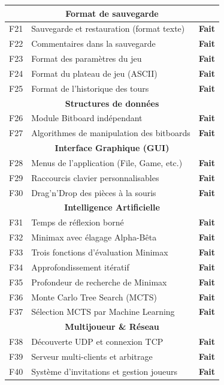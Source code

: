 \documentclass[a4paper]{article}
\newcommand{\fait}{\textcolor{green!70!black}{\textbf{Fait}}}
\begin{document}
\begin{center}
\begin{longtable}{|c|p{8.5cm}|c|}
\multicolumn{3}{|c|}{\cellcolor{gray!20}\textbf{Format de sauvegarde}} \\ \hline
F21 & Sauvegarde et restauration (format texte)  & \fait \\ \hline
F22 & Commentaires dans la sauvegarde  & \fait \\ \hline
F23 & Format des paramètres du jeu  & \fait \\ \hline
F24 & Format du plateau de jeu (ASCII)  & \fait \\ \hline
F25 & Format de l'historique des tours  & \fait \\ \hline

\multicolumn{3}{|c|}{\cellcolor{gray!20}\textbf{Structures de données}} \\ \hline
F26 & Module Bitboard indépendant  & \fait \\ \hline
F27 & Algorithmes de manipulation des bitboards  & \fait \\ \hline

\multicolumn{3}{|c|}{\cellcolor{gray!20}\textbf{Interface Graphique (GUI)}} \\ \hline
F28 & Menus de l'application (File, Game, etc.)  & \fait \\ \hline
F29 & Raccourcis clavier personnalisables  & \fait \\ \hline
F30 & Drag'n'Drop des pièces à la souris  & \fait \\ \hline

\multicolumn{3}{|c|}{\cellcolor{gray!20}\textbf{Intelligence Artificielle}} \\ \hline
F31 & Temps de réflexion borné  & \fait \\ \hline
F32 & Minimax avec élagage Alpha-Bêta  & \fait \\ \hline
F33 & Trois fonctions d'évaluation Minimax  & \fait \\ \hline
F34 & Approfondissement itératif  & \fait \\ \hline
F35 & Profondeur de recherche de Minimax  & \fait \\ \hline
F36 & Monte Carlo Tree Search (MCTS)  & \fait \\ \hline
F37 & Sélection MCTS par Machine Learning  & \fait \\ \hline

\multicolumn{3}{|c|}{\cellcolor{gray!20}\textbf{Multijoueur \& Réseau}} \\ \hline
F38 & Découverte UDP et connexion TCP  & \fait \\ \hline
F39 & Serveur multi-clients et arbitrage  & \fait \\ \hline
F40 & Système d'invitations et gestion joueurs  & \fait \\ \hline
\end{longtable}
\end{center}
\end{document}
